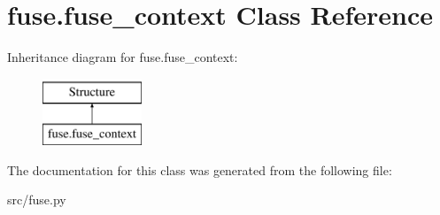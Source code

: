 \hypertarget{classfuse_1_1fuse__context}{\section{fuse.\-fuse\-\_\-context Class Reference}
\label{classfuse_1_1fuse__context}
}
Inheritance diagram for fuse.\-fuse\-\_\-context\-:\begin{figure}[H]
\begin{center}
\leavevmode
\includegraphics[height=2.000000cm]{classfuse_1_1fuse__context}
\end{center}
\end{figure}


The documentation for this class was generated from the following file\-:\begin{DoxyCompactItemize}
\item 
src/fuse.\-py\end{DoxyCompactItemize}
